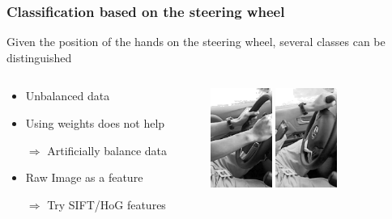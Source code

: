 \documentclass{beamer}
\begin{document}
     \begin{frame}
     	\frametitle{Classification based on the steering wheel}
     	Given the position of the hands on the steering wheel, several classes can be distinguished
     	\begin{columns}
     		\begin{column}{0.5\textwidth}
     			\begin{itemize}
     				\item Unbalanced data
     				\item Using weights does not help
     				\item[$\Rightarrow$] Artificially balance data
     				\vspace{0.3cm}
     				\item Raw Image as a feature
     				\item[$\Rightarrow$] Try SIFT/HoG features
     			\end{itemize}
     		\end{column}
     		\begin{column}{0.5\textwidth}  %
     			\begin{center}
     				\includegraphics[width=0.3\textwidth]{steering_wheel1} \hspace{0.1cm}
     				\includegraphics[width=0.3\textwidth]{steering_wheel2} \\\vspace{0.1cm}

\end{center}
\end{column}
\end{columns}
\end{frame}
\end{document}
